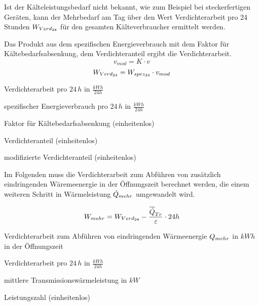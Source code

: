 Ist der Kälteleistungsbedarf nicht bekannt, wie zum Beispiel bei steckerfertigen
Geräten, kann der Mehrbedarf am Tag \"uber den Wert Verdichterarbeit pro 24
Stunden $\lverd$ für den gesamten Kälteverbraucher ermittelt werden.

Das Produkt aus dem spezifischen Energieverbrauch mit dem Faktor für
Kältebedarfsabsenkung, dem Verdichteranteil ergibt die Verdichterarbeit.
\begin{equation}
	v_{mod} = K \cdot v
\label{vmod}
\end{equation}
\begin{equation}
	\lverd = \lspez \cdot v_{mod}
\label{lverd}
\end{equation}

\begin{description}[\dth]

	\item[$\lverd$] Verdichterarbeit pro $24\,h$ in $\frac{kWh}{24h}$
	\item[$\lspez$] spezifischer Energieverbrauch pro $24\,h$ in
		$\frac{kWh}{24h}$
	\item[$K$] Faktor für Kältebedarfsabsenkung (einheitenlos)
	\item[$v$] Verdichteranteil (einheitenlos)
	\item[$v_{mod}$] modifizierte Verdichteranteil (einheitenlos)

\end{description}
\vspace{0.5cm}

Im Folgenden muss die Verdichterarbeit zum Abf\"uhren von zus\"atzlich
eindringenden W\"aremeenergie in der \"Offnungszeit berechnet werden, die einem
weiteren Schritt in W\"armeleistung $\dot{Q}_{mehr}$ umgewandelt wird.

\begin{equation}
	\lmehr = \lverd - \frac{\aptrans}{\epsilon} \cdot 24h
\label{lmehr}
\end{equation}

\begin{description}[\dth]

	\item[$\lmehr$] Verdichterarbeit zum Abführen von eindringenden
		Wärmeenergie $Q_{mehr}$ in $kWh$ in der \"Offnungszeit
	\item[$\lverd$] Verdichterarbeit pro $24\,h$ in $\frac{kWh}{24h}$
	\item[$\aptrans$] mittlere Transmissionswärmeleistung in $kW$
	\item[$\epsilon$] Leistungszahl (einheitenlos)

\end{description}
\vspace{0.5cm}

